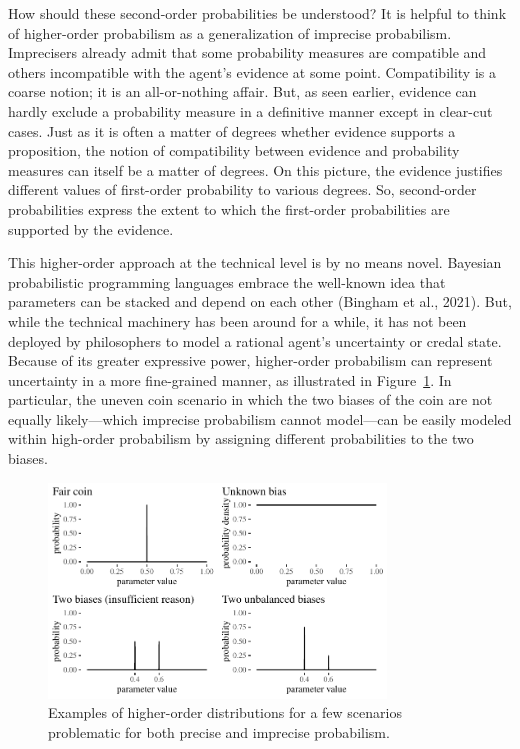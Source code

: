 \documentclass[
  letterpaper,
  DIV=11,
  numbers=noendperiod]{scrartcl}
\begin{document}
How should these second-order probabilities be understood? It is helpful
to think of higher-order probabilism as a generalization of imprecise
probabilism. Imprecisers already admit that some probability measures
are compatible and others incompatible with the agent's evidence at some
point. Compatibility is a coarse notion; it is an all-or-nothing affair.
But, as seen earlier, evidence can hardly exclude a probability measure
in a definitive manner except in clear-cut cases. Just as it is often a
matter of degrees whether evidence supports a proposition, the notion of
compatibility between evidence and probability measures can itself be a
matter of degrees. On this picture, the evidence justifies different
values of first-order probability to various degrees. So, second-order
probabilities express the extent to which the first-order probabilities
are supported by the evidence.

This higher-order approach at the technical level is by no means novel.
Bayesian probabilistic programming languages embrace the well-known idea
that parameters can be stacked and depend on each other (Bingham et al.,
2021). But, while the technical machinery has been around for a while,
it has not been deployed by philosophers to model a rational agent's
uncertainty or credal state. Because of its greater expressive power,
higher-order probabilism can represent uncertainty in a more
fine-grained manner, as illustrated in
Figure~\ref{fig-evidenceResponse}. In particular, the uneven coin
scenario in which the two biases of the coin are not equally
likely---which imprecise probabilism cannot model---can be easily
modeled within high-order probabilism by assigning different
probabilities to the two biases.

\begin{figure}[t]

{\centering \includegraphics[width=0.8\textwidth,height=\textheight]{imp_philosophical_files/figure-pdf/fig-evidenceResponse-1.pdf}

}

\caption{\label{fig-evidenceResponse}Examples of higher-order
distributions for a few scenarios problematic for both precise and
imprecise probabilism.}

\end{figure}
\end{document}
